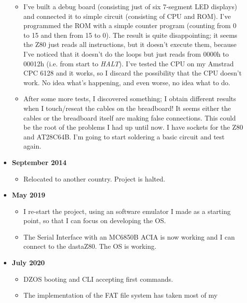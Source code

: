 \documentclass[a4paper,11pt]{article}
\begin{document}
\begin{itemize}
        \begin{itemize}
            \item I've built a debug board (consisting just of six 7-segment LED
            displays) and connected it to simple circuit (consisting of CPU and
            ROM). I've programmed the ROM with a simple counter program
            (counting from 0 to 15 and then from 15 to 0). The result is quite
            disappointing; it seems the Z80 just reads all instructions, but it
            doesn't execute them, because I've noticed that it doesn't do the
            loops but just reads from 0000h to 00012h (i.e. from start to
            \textit{HALT}). I've tested the CPU on my Amstrad CPC 6128 and it
            works, so I discard the possibility that the CPU doesn't work. No
            idea what's happening, and even worse, no idea what to do. 
            \item After some more tests, I discovered something; I obtain
            different results when I touch/reseat the cables on the breadboard!
            It seems either the cables or the breadboard itself are making false
            connections. This could be the root of the problems I had up until
            now. I have sockets for the Z80 and AT28C64B. I'm going to start
            soldering a basic circuit and test again.
        \end{itemize}
        \item \textbf{September 2014}
        \begin{itemize}
            \item Relocated to another country. Project is halted.
        \end{itemize}
        \item \textbf{May 2019}
        \begin{itemize}
            \item I re-start the project, using an software emulator I made as a
            starting point, so that I can focus on developing the OS.
            \item The Serial Interface with an MC6850B ACIA is now working and I
            can connect to the dastaZ80. The OS is working.
        \end{itemize}
        \item \textbf{July 2020}
        \begin{itemize}
            \item DZOS booting and CLI accepting first commands.
            \item The implementation of the FAT file system has taken most of my

\end{itemize}
\end{itemize}
\end{document}
